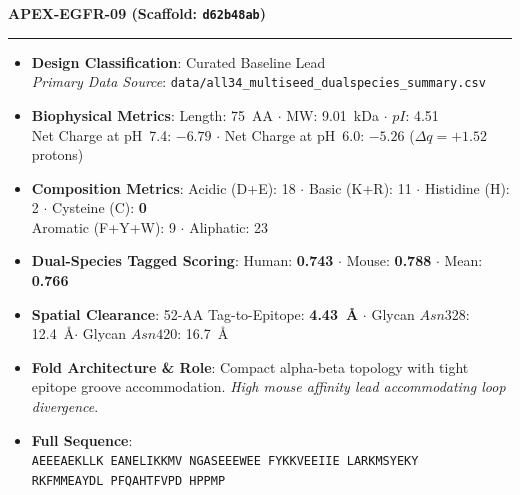 \documentclass[11pt]{article}
\begin{document}
\noindent\textbf{\color{navyblue}\large APEX-EGFR-09  \quad (Scaffold: \texttt{d62b48ab})} \\
\vspace{-0.4em}
\rule{\textwidth}{0.6pt}
\vspace{-0.2em}
\begin{itemize}
  \setlength{\itemsep}{2pt}
  \setlength{\parskip}{0pt}
  \item \textbf{Design Classification}: Curated Baseline Lead \\
    \textit{Primary Data Source}: \texttt{\small data/all34\_multiseed\_dualspecies\_summary.csv}
  \item \textbf{Biophysical Metrics}: Length: 75~AA $\cdot$ MW: 9.01~kDa $\cdot$ $pI$: 4.51 \\
    Net Charge at pH~7.4: $-6.79$ $\cdot$ Net Charge at pH~6.0: $-5.26$ ($\Delta q = +1.52$ protons)
  \item \textbf{Composition Metrics}: Acidic (D+E): 18 $\cdot$ Basic (K+R): 11 $\cdot$ Histidine (H): 2 $\cdot$ Cysteine (C): \textbf{0} \\
    Aromatic (F+Y+W): 9 $\cdot$ Aliphatic: 23
  \item \textbf{Dual-Species Tagged Scoring}: Human: \textbf{0.743} $\cdot$ Mouse: \textbf{0.788} $\cdot$ Mean: \textbf{0.766}
  \item \textbf{Spatial Clearance}: 52-AA Tag-to-Epitope: \textbf{4.43~\AA} $\cdot$ Glycan $Asn328$: 12.4~\AA $\cdot$ Glycan $Asn420$: 16.7~\AA
  \item \textbf{Fold Architecture \& Role}: Compact alpha-beta topology with tight epitope groove accommodation. \textit{High mouse affinity lead accommodating loop divergence}.
  \item \textbf{Full Sequence}: \\
    \texttt{\small AEEEAEKLLK EANELIKKMV NGASEEEWEE FYKKVEEIIE LARKMSYEKY \\
    RKFMMEAYDL PFQAHTFVPD HPPMP}
\end{itemize}
\vspace{0.8em}
\end{document}
